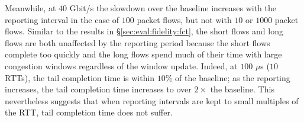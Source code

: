 Meanwhile, at $40$ Gbit/s the slowdown over the baseline increases with the reporting interval in the case of $100$ packet flows, but not with $10$ or $1000$ packet flows. 
Similar to the results in \S\ref{sec:eval:fidelity:fct}, the short flows and long flows are both unaffected by the reporting period because the short flows complete too quickly and the long flows spend much of their time with large congestion windows regardless of the window update.
Indeed, at $100$ $\mu$s ($10$ RTTs), the tail completion time is within $10$\% of the baseline; as the reporting increases, the tail completion time increases to over $2\times$ the baseline. 
This nevertheless suggests that when reporting intervals are kept to small multiples of the RTT, tail completion time does not suffer.
